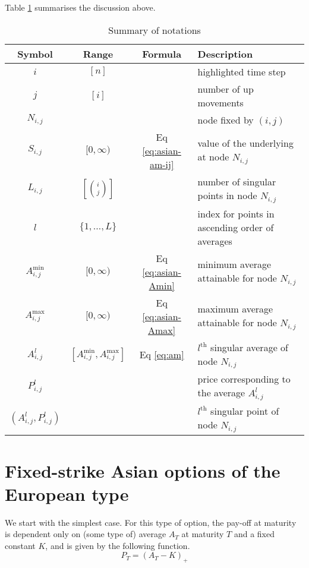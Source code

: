 Table \ref{tab:asian-notations} summarises the discussion above.

\begin{table}[h]
	\centering
	\caption{Summary of notations}
	\label{tab:asian-notations}
	\begin{tabular}{cccl}
		\toprule
		Symbol & Range & Formula & Description \\
		\midrule
		$ i $ & $ [ n ] $ & & highlighted time step \\
		$ j $ & $ [ i ] $ & & number of up movements \\
		$ N_{i,j} $ & & & node fixed by $ (i,j) $ \\
		$ S_{i,j} $ & $ [0, \infty) $ & Eq \ref{eq:asian-am-ij} & value of the underlying at node $ N_{i,j} $ \\
		$ L_{i,j} $ & $ \left[ \binom{i}{j} \right] $ & & number of singular points in node $ N_{i,j} $ \\
		$ l $ & $ \{ 1, \dots, L \} $ & & index for points in ascending order of averages \\
		$ A_{i,j}^{\min} $ & $ [0, \infty) $ & Eq \ref{eq:asian-Amin} & minimum average attainable for node $ N_{i,j} $ \\
		$ A_{i,j}^{\max} $ & $ [0, \infty) $ & Eq \ref{eq:asian-Amax} & maximum average attainable for node $ N_{i,j} $ \\
		$ A_{i,j}^l $ & $ \left[ A_{i,j}^{\min}, A_{i,j}^{\max} \right] $ & Eq \ref{eq:am} & $ l^\mathrm{th} $ singular average of node $ N_{i,j} $ \\
		$ P_{i,j}^l $ & & & price corresponding to the average $ A_{i,j}^l $ \\
		$ (A_{i,j}^l, P_{i,j}^l) $ & & & $ l^\mathrm{th} $ singular point of node $ N_{i,j} $ \\
		\bottomrule
	\end{tabular}
\end{table}



\section{Fixed-strike Asian options of the European type}
\label{sec:fixed-strike-eu}

We start with the simplest case. For this type of option, the pay-off at maturity is dependent only on (some type of) average $ A_T $ at maturity $ T $ and a fixed constant $ K $, and is given by the following function.
\begin{equation}
	\label{eq:asian-price-eu-asian-am}
	P_T = (A_T - K)_+
\end{equation}

